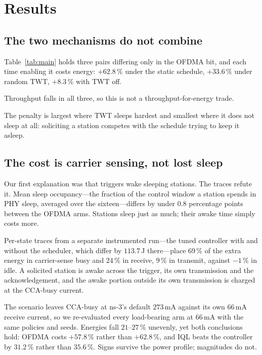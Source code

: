 \section{Results}
\label{sec:results}



\subsection{The two mechanisms do not combine}

Table~\ref{tab:main} holds three pairs differing only in the OFDMA bit, and
each time enabling it costs energy: $+62.8\,\%$ under the static schedule,
$+33.6\,\%$ under random TWT, $+8.3\,\%$ with TWT off.

Throughput falls in all three, so this is not a throughput-for-energy trade.

The penalty is largest where TWT sleeps hardest and smallest where it does not
sleep at all: soliciting a station competes with the schedule trying to keep it
asleep.

\subsection{The cost is carrier sensing, not lost sleep}

Our first explanation was that triggers wake sleeping stations. The traces
refute it. Mean sleep occupancy---the fraction of the control window a station
spends in PHY sleep, averaged over the sixteen---differs by under $0.8$
percentage points between the OFDMA arms. Stations sleep just as much; their
awake time simply costs more.

Per-state traces from a separate instrumented run---the tuned controller with
and without the scheduler, which differ by $113.7$\,J there---place $69\,\%$
of the extra energy in carrier-sense busy and $24\,\%$ in receive, $9\,\%$ in
transmit, against $-1\,\%$ in idle. A solicited station is awake across the
trigger, its own transmission and the acknowledgement, and the awake portion
outside its own transmission is charged at the CCA-busy current.

The scenario leaves CCA-busy at ns-3's default $273$\,mA against its own
$66$\,mA receive current, so we re-evaluated every load-bearing arm at
$66$\,mA with the same policies and seeds. Energies fall $21$--$27\,\%$
unevenly, yet both conclusions hold: OFDMA costs $+57.8\,\%$ rather than
$+62.8\,\%$, and IQL beats the controller by $31.2\,\%$ rather than
$35.6\,\%$. Signs survive the power profile; magnitudes do not.

